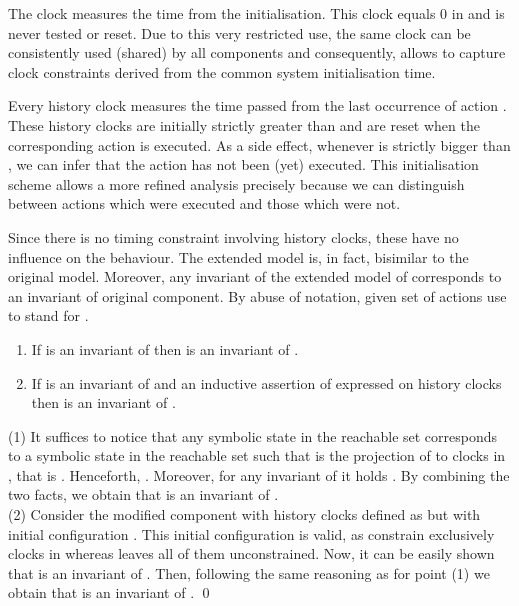 \documentclass{LMCS}
\newcommand{\mycomment}[1]{}
\theoremstyle{plain}\newtheorem{remark}[thm]{Remark}
\theoremstyle{plain}\newtheorem{example}[thm]{Example}
\begin{document}
The clock  measures the time from the initialisation.  This clock
equals 0 in  and is never tested or reset.  Due to this very
restricted use, the same clock  can be consistently used (shared) by
all components  and consequently, allows to capture clock constraints
derived from the common system initialisation time.

Every history clock  measures the time passed from the last
occurrence of action .  These history clocks are initially strictly
greater than  and are reset when the corresponding action is
executed. As a side effect, whenever  is strictly bigger than
, we can infer that the action  has not been (yet) executed.
This initialisation scheme allows a more refined analysis precisely
because we can distinguish between actions which were executed and
those which were not.

\mycomment{ In fact,
  if the history clocks were initialised to be equal to  at the
  start time, the global invariant would allow to reflect that all the
  actions have occurred at instant , which is generally
  spurious. In addition, in the following subsections, the method
  proposes an invariant expressing some \textit{separations} between
  the history clocks in some cases. This would induce inaccuracy if
  the history clocks are supposed all equal initially.  Following this
  reasoning, we initialised the history clocks to be strictly positive
  at start time, without giving them concrete values.  }

Since there is no timing constraint involving history clocks, these have no
influence on the behaviour. The extended model is, in fact, bisimilar to
the original model. Moreover, any invariant of the extended model of
 corresponds to an invariant of original component.  By abuse of
notation, given set of actions  use  to
stand for .

\begin{prop} \label{p:tah} \hfill
  \begin{enumerate}
  \item If  is an invariant of  then  is an invariant of .
  \item If  is an invariant of  and  an inductive
    assertion of  expressed on history clocks  then  is an invariant of .
  \end{enumerate}
\end{prop}

\proof (1) It suffices to notice that any symbolic state  in the reachable set  corresponds to
a symbolic state  in the reachable set 
such that  is the projection of  to clocks in ,
that is .  Henceforth, .  Moreover, for
any invariant  of  it holds .  By
combining the two facts, we obtain that  is an invariant of
. \\
\hspace*{1cm} (2) Consider the modified component with history clocks
 defined as  but with initial configuration .  This initial configuration is valid, as
 constrain exclusively clocks in  whereas  leaves
all of them unconstrained.  Now, it can be easily shown that  is an invariant of .  Then, following the
same reasoning as for point (1) we obtain that  is an invariant of .  \qed
\end{document}
